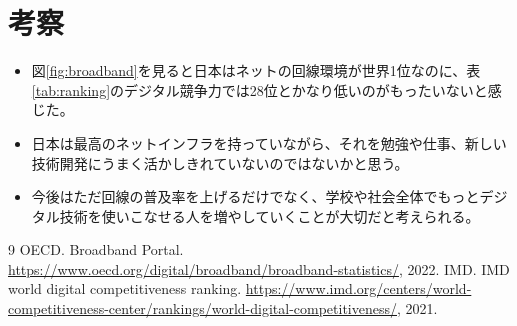 \documentclass[uplatex,11pt]{jsarticle}
\begin{document}
\section{考察}
\begin{itemize}
    \item 図\ref{fig:broadband}を見ると日本はネットの回線環境が世界1位なのに、表\ref{tab:ranking}のデジタル競争力では28位とかなり低いのがもったいないと感じた。
    \item 日本は最高のネットインフラを持っていながら、それを勉強や仕事、新しい技術開発にうまく活かしきれていないのではないかと思う。
    \item 今後はただ回線の普及率を上げるだけでなく、学校や社会全体でもっとデジタル技術を使いこなせる人を増やしていくことが大切だと考えられる。
\end{itemize}

\vspace{3em}

\begin{thebibliography}{9}
     OECD. Broadband Portal. \url{https://www.oecd.org/digital/broadband/broadband-statistics/}, 2022.
     IMD. IMD world digital competitiveness ranking. \url{https://www.imd.org/centers/world-competitiveness-center/rankings/world-digital-competitiveness/}, 2021.
\end{thebibliography}
\end{document}
